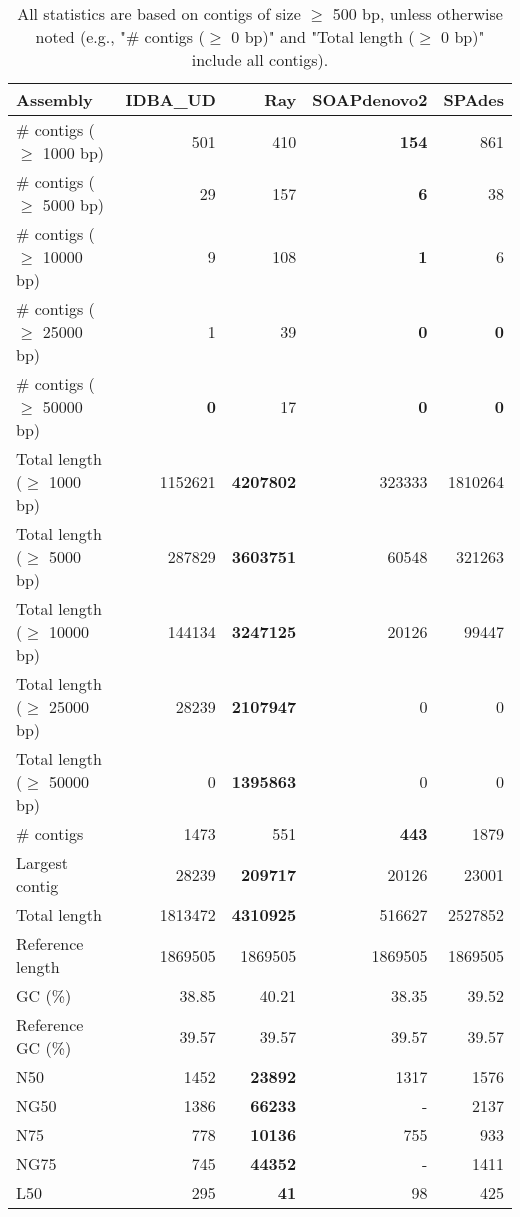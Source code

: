 \documentclass[12pt,a4paper]{article}
\begin{document}
\begin{table}[ht]
\begin{center}
\caption{All statistics are based on contigs of size $\geq$ 500 bp, unless otherwise noted (e.g., "\# contigs ($\geq$ 0 bp)" and "Total length ($\geq$ 0 bp)" include all contigs).}
\begin{tabular}{|l*{4}{|r}|}
\hline
Assembly & IDBA\_UD & Ray & SOAPdenovo2 & SPAdes \\ \hline
\# contigs ($\geq$ 1000 bp) & 501 & 410 & {\bf 154} & 861 \\ \hline
\# contigs ($\geq$ 5000 bp) & 29 & 157 & {\bf 6} & 38 \\ \hline
\# contigs ($\geq$ 10000 bp) & 9 & 108 & {\bf 1} & 6 \\ \hline
\# contigs ($\geq$ 25000 bp) & 1 & 39 & {\bf 0} & {\bf 0} \\ \hline
\# contigs ($\geq$ 50000 bp) & {\bf 0} & 17 & {\bf 0} & {\bf 0} \\ \hline
Total length ($\geq$ 1000 bp) & 1152621 & {\bf 4207802} & 323333 & 1810264 \\ \hline
Total length ($\geq$ 5000 bp) & 287829 & {\bf 3603751} & 60548 & 321263 \\ \hline
Total length ($\geq$ 10000 bp) & 144134 & {\bf 3247125} & 20126 & 99447 \\ \hline
Total length ($\geq$ 25000 bp) & 28239 & {\bf 2107947} & 0 & 0 \\ \hline
Total length ($\geq$ 50000 bp) & 0 & {\bf 1395863} & 0 & 0 \\ \hline
\# contigs & 1473 & 551 & {\bf 443} & 1879 \\ \hline
Largest contig & 28239 & {\bf 209717} & 20126 & 23001 \\ \hline
Total length & 1813472 & {\bf 4310925} & 516627 & 2527852 \\ \hline
Reference length & 1869505 & 1869505 & 1869505 & 1869505 \\ \hline
GC (\%) & 38.85 & 40.21 & 38.35 & 39.52 \\ \hline
Reference GC (\%) & 39.57 & 39.57 & 39.57 & 39.57 \\ \hline
N50 & 1452 & {\bf 23892} & 1317 & 1576 \\ \hline
NG50 & 1386 & {\bf 66233} & - & 2137 \\ \hline
N75 & 778 & {\bf 10136} & 755 & 933 \\ \hline
NG75 & 745 & {\bf 44352} & - & 1411 \\ \hline
L50 & 295 & {\bf 41} & 98 & 425 \\ \hline

\end{tabular}
\end{center}
\end{table}
\end{document}
